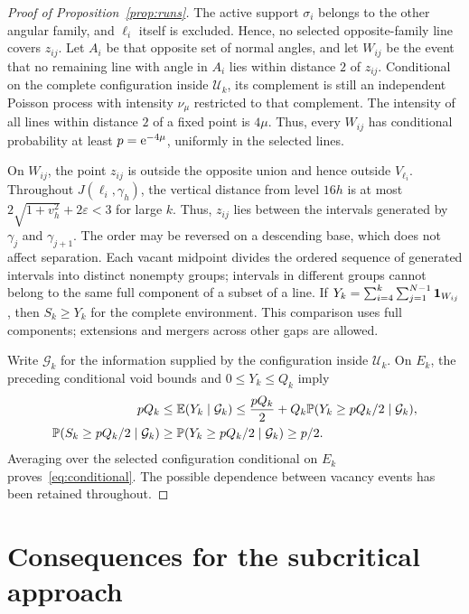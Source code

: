 \documentclass[11pt,letterpaper]{article}
\begin{document}
\begin{proof}[Proof of Proposition~\ref{prop:runs}]
The active support $\sigma_i$ belongs to the other angular family, and $\ell_i$ itself is excluded. Hence, no selected opposite-family line covers $z_{ij}$. Let $A_i$ be that opposite set of normal angles, and let $W_{ij}$ be the event that no remaining line with angle in $A_i$ lies within distance $2$ of $z_{ij}$. Conditional on the complete configuration inside $\mathscr U_k$, its complement is still an independent Poisson process with intensity $\nu_\mu$ restricted to that complement. The intensity of all lines within distance $2$ of a fixed point is $4\mu$. Thus, every $W_{ij}$ has conditional probability at least $p=\mathrm{e}^{-4\mu}$, uniformly in the selected lines.

On $W_{ij}$, the point $z_{ij}$ is outside the opposite union and hence outside $V_{\ell_i}$. Throughout $J(\ell_i,\gamma_h)$, the vertical distance from level $16h$ is at most $2\sqrt{1+v_h^2}+2\varepsilon<3$ for large $k$. Thus, $z_{ij}$ lies between the intervals generated by $\gamma_j$ and $\gamma_{j+1}$. The order may be reversed on a descending base, which does not affect separation. Each vacant midpoint divides the ordered sequence of generated intervals into distinct nonempty groups; intervals in different groups cannot belong to the same full component of a subset of a line. If $Y_k=\sum_{i=4}^k\sum_{j=1}^{N-1}\mathbf{1}_{W_{ij}}$, then $S_k\ge Y_k$ for the complete environment. This comparison uses full components; extensions and mergers across other gaps are allowed.

Write $\mathcal G_k$ for the information supplied by the configuration inside $\mathscr U_k$. On $E_k$, the preceding conditional void bounds and $0\le Y_k\le Q_k$ imply
\begin{equation}\label{eq:vacancy}
\begin{aligned}
 pQ_k&\le\mathbb E(Y_k\mid\mathcal G_k)
       \le\frac{pQ_k}{2}
          +Q_k\mathbb P(Y_k\ge pQ_k/2\mid\mathcal G_k),\\
 \mathbb P(S_k\ge pQ_k/2\mid\mathcal G_k)
       &\ge\mathbb P(Y_k\ge pQ_k/2\mid\mathcal G_k)\ge p/2.
\end{aligned}
\end{equation}
Averaging over the selected configuration conditional on $E_k$ proves~\eqref{eq:conditional}. The possible dependence between vacancy events has been retained throughout.
\end{proof}

\section{Consequences for the subcritical approach}
\end{document}
